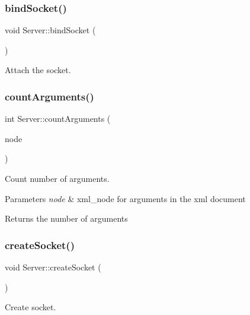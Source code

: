 \subsubsection{\texorpdfstring{bind\+Socket()}{bindSocket()}}
{\footnotesize\ttfamily void Server\+::bind\+Socket (\begin{DoxyParamCaption}{ }\end{DoxyParamCaption})\hspace{0.3cm}{\ttfamily [private]}}

Attach the socket. \mbox{\label{classServer_ad5472ee30f2eb795c29432d3cc7dac15}} 
\subsubsection{\texorpdfstring{count\+Arguments()}{countArguments()}}
{\footnotesize\ttfamily int Server\+::count\+Arguments (\begin{DoxyParamCaption}\item[{xml\+\_\+node}]{node }\end{DoxyParamCaption})\hspace{0.3cm}{\ttfamily [private]}}

Count number of arguments. 
\begin{DoxyParams}{Parameters}
{\em node} & xml\+\_\+node for arguments in the xml document \\
\hline
\end{DoxyParams}
\begin{DoxyReturn}{Returns}
the number of arguments 
\end{DoxyReturn}
\mbox{\label{classServer_afa110e18047a3345bca72ed32ca3ce95}} 
\subsubsection{\texorpdfstring{create\+Socket()}{createSocket()}}
{\footnotesize\ttfamily void Server\+::create\+Socket (\begin{DoxyParamCaption}{ }\end{DoxyParamCaption})\hspace{0.3cm}{\ttfamily [private]}}

Create socket. \mbox{\label{classServer_ab841af239c77eeb2ec47e7893d51dfe0}} 
